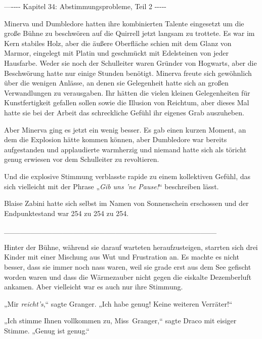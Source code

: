 

\hypertarget{abstimmungsprobleme-teil-2}{%

—\/-\/-\/-\/- Kapitel 34: Abstimmungsprobleme, Teil 2 -\/-\/-\/-\/-

Minerva und Dumbledore hatten ihre kombinierten Talente eingesetzt um die große Bühne zu beschwören auf die Quirrell jetzt langsam zu trottete. Es war im Kern stabiles Holz, aber die äußere Oberfläche schien mit dem Glanz von Marmor, eingelegt mit Platin und geschmückt mit Edelsteinen von jeder Hausfarbe. Weder sie noch der Schulleiter waren Gründer von Hogwarts, aber die Beschwörung hatte nur einige Stunden benötigt. Minerva freute sich gewöhnlich über die wenigen Anlässe, an denen sie Gelegenheit hatte sich an großen Verwandlungen zu verausgaben. Ihr hätten die vielen kleinen Gelegenheiten für Kunstfertigkeit gefallen sollen sowie die Illusion von Reichtum, aber dieses Mal hatte sie bei der Arbeit das schreckliche Gefühl ihr eigenes Grab auszuheben.

Aber Minerva ging es jetzt ein wenig besser. Es gab einen kurzen Moment, an dem die Explosion hätte kommen können, aber Dumbledore war bereits aufgestanden und applaudierte warmherzig und niemand hatte sich als töricht genug erwiesen vor dem Schulleiter zu revoltieren.

Und die explosive Stimmung verblasste rapide zu einem kollektiven Gefühl, das sich vielleicht mit der Phrase „\emph{Gib uns 'ne Pause!}“ beschreiben lässt.

Blaise Zabini hatte sich selbst im Namen von Sonnenschein erschossen und der Endpunktestand war 254 zu 254 zu 254.

\_\_\_\_\_\_\_\_\_\_\_\_\_\_\_\_\_\_\_\_\_\_\_\_\_\_\_\_\_\_\_\_\_\_\_\_\_\_\_\_

Hinter der Bühne, während sie darauf warteten heraufzusteigen, starrten sich drei Kinder mit einer Mischung aus Wut und Frustration an. Es machte es nicht besser, dass sie immer noch nass waren, weil sie grade erst aus dem See gefischt worden waren und dass die Wärmezauber nicht gegen die eiskalte Dezemberluft ankamen. Aber vielleicht war es auch nur ihre Stimmung.

„Mir \emph{reicht's},“ sagte Granger. „Ich habe genug! Keine weiteren Verräter!“

„Ich stimme Ihnen vollkommen zu, Miss~Granger,“ sagte Draco mit eisiger Stimme. „Genug ist genug.“

}
